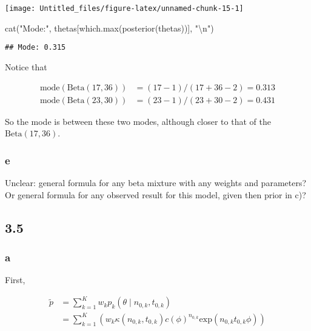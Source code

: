 \documentclass[
]{article}
\newenvironment{Shaded}{\begin{snugshade}}{\end{snugshade}}
\newcommand{\FunctionTok}[1]{\textcolor[rgb]{0.00,0.00,0.00}{#1}}
\newcommand{\NormalTok}[1]{#1}
\newcommand{\SpecialCharTok}[1]{\textcolor[rgb]{0.00,0.00,0.00}{#1}}
\newcommand{\StringTok}[1]{\textcolor[rgb]{0.31,0.60,0.02}{#1}}
\begin{document}
\begin{center}\texttt{[image: Untitled\_files/figure-latex/unnamed-chunk-15-1]} \end{center}

\begin{Shaded}
\begin{Highlighting}[]
\FunctionTok{cat}\NormalTok{(}\StringTok{"Mode:"}\NormalTok{, thetas[}\FunctionTok{which.max}\NormalTok{(}\FunctionTok{posterior}\NormalTok{(thetas))], }\StringTok{"}\SpecialCharTok{\textbackslash{}n}\StringTok{"}\NormalTok{)}
\end{Highlighting}
\end{Shaded}

\begin{verbatim}
## Mode: 0.315
\end{verbatim}

Notice that

\begin{align}
\text{mode}(\text{Beta}(17, 36)) &= (17 - 1) / (17 + 36 - 2) = 0.313 \\
\text{mode}(\text{Beta}(23, 30)) &= (23 - 1) / (23 + 30 - 2) = 0.431
\end{align}

So the mode is between these two modes, although closer to that of the
\(\text{Beta}(17, 36)\).

\hypertarget{e-1}{%
\subsubsection{e}\label{e-1}}

Unclear: general formula for any beta mixture with any weights and
parameters? Or general formula for any observed result for this model,
given then prior in c)?

\hypertarget{section-4}{%
\subsection{3.5}\label{section-4}}

\hypertarget{a-3}{%
\subsubsection{a}\label{a-3}}

First,

\begin{align}
\tilde{p} &= \sum_{k = 1}^K w_k p_k (\theta \mid n_{0, k}, t_{0, k}) \\
&= \sum_{k = 1}^K \left( w_k \kappa (n_{0, k}, t_{0, k}) c(\phi)^{n_{0, k}} \text{exp}(n_{0, k} t_{0, k} \phi) \right) \\
\end{align}
\end{document}
